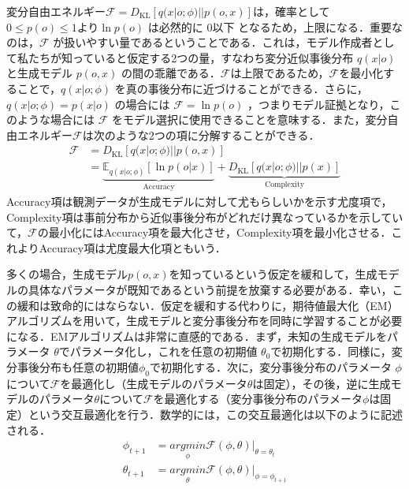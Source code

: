 \documentclass[a4paper, titlepage]{jsarticle}
\begin{document}
変分自由エネルギー$\mathcal{F} = D_{\mathrm{KL}}[q(x|o; \phi)||p(o, x)]$は，確率として $0 ≤ p(o) ≤ 1$より$\ln p(o)$ は必然的に 0以下 となるため，上限になる．重要なのは，$\mathcal{F}$ が扱いやすい量であるということである．これは，モデル作成者として私たちが知っていると仮定する2つの量，すなわち変分近似事後分布 $q(x|o)$ と生成モデル $p(o, x)$ の間の乖離である．$\mathcal{F}$は上限であるため，$\mathcal{F}$を最小化することで，$q(x|o; \phi)$ を真の事後分布に近づけることができる．さらに，$q(x|o; \phi) = p(x|o)$ の場合には $\mathcal{F} = \ln p(o)$ ，つまりモデル証拠となり，このような場合には $\mathcal{F}$ をモデル選択に使用できることを意味する．また，変分自由エネルギー$\mathcal{F}$は次のような2つの項に分解することができる．
\begin{equation*}
   \begin{aligned}
      \mathcal{F}&=D_{\mathrm{KL}}[q(x|o;\phi)||p(o,x)] \\
      &=\underbrace{\mathbb{E}_{q(x|o;\phi)}[\ln p(o|x)]}_{\mathrm{Accuracy}}+\underbrace{D_{\mathrm{KL}}[q(x|o;\phi)||p(x)]}_{\mathrm{Complexity}}
   \end{aligned}
\end{equation*}
Accuracy項は観測データが生成モデルに対して尤もらしいかを示す尤度項で，Complexity項は事前分布から近似事後分布がどれだけ異なっているかを示していて，$\mathcal{F}$の最小化にはAccuracy項を最大化させ，Complexity項を最小化させる．これよりAccuracy項は尤度最大化項ともいう．
\par
多くの場合，生成モデル$p(o,x)$を知っているという仮定を緩和して，生成モデルの具体なパラメータが既知であるという前提を放棄する必要がある．幸い，この緩和は致命的にはならない．仮定を緩和する代わりに，期待値最大化（EM）アルゴリズムを用いて，生成モデルと変分事後分布を同時に学習することが必要になる．EMアルゴリズムは非常に直感的である．まず，未知の生成モデルをパラメータ $\theta$でパラメータ化し，これを任意の初期値 $\theta_0$で初期化する．同様に，変分事後分布も任意の初期値$\phi_0$で初期化する．次に，変分事後分布のパラメータ $\phi$について$\mathcal{F}$を最適化し（生成モデルのパラメータ$\theta$は固定），その後，逆に生成モデルのパラメータ$\theta$について$\mathcal{F}$を最適化する（変分事後分布のパラメータ$\phi$は固定）という交互最適化を行う．数学的には，この交互最適化は以下のように記述される．
\begin{equation}
   \begin{aligned}
      \phi_{t+1}&=\underset{\phi}{argmin}\mathcal{F}(\phi,\theta)|_{\theta=\theta_t} \\
      \theta_{t+1}&=\underset{\theta}{argmin}\mathcal{F}(\phi,\theta)|_{\phi=\phi_{t+1}}
   \end{aligned}
\end{equation}
\end{document}

